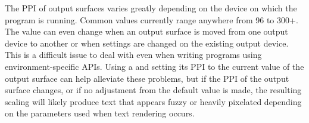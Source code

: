\pnum
\begin{note}
 The PPI of output surfaces varies greatly depending on the device on which the program is running. Common values currently range anywhere from 96 to 300+. The value can even change when an output surface is moved from one output device to another or when settings are changed on the existing output device. This is a difficult issue to deal with even when writing programs using environment-specific APIs. Using a  and setting its PPI to the current value of the output surface can help alleviate these problems, but if the PPI of the output surface changes, or if no adjustment from the default value is made, the resulting scaling will likely produce text that appears fuzzy or heavily pixelated depending on the parameters used when text rendering occurs.
 \end{note}
